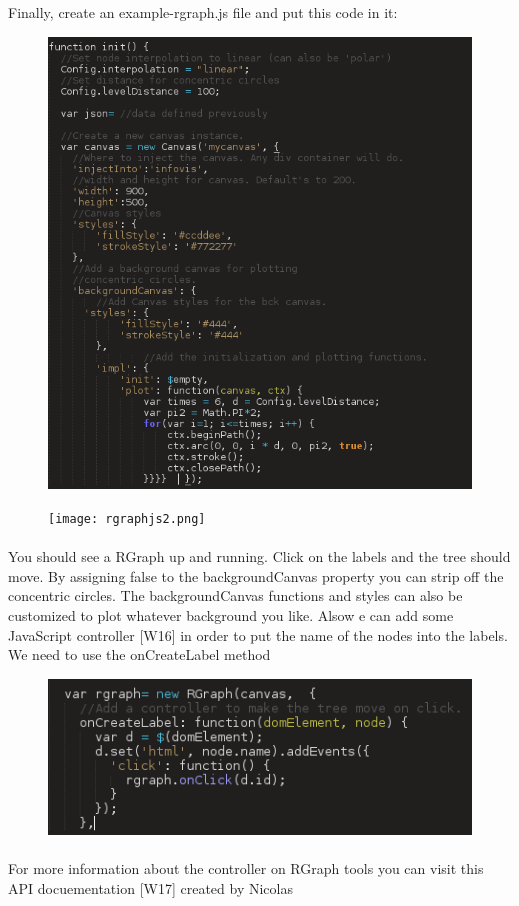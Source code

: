 Finally, create an example-rgraph.js file and put this code in it:
\newpage
\begin{figure}[h]
\centering
\includegraphics[scale=0.5]{rgraphjs1.png}
\end{figure}
\begin{figure}[h]
\centering
\texttt{[image: rgraphjs2.png]}
\end{figure}
\newpage
\paragraph*{}
You should see a RGraph up and running. Click on the labels and the tree should move. By assigning false to the backgroundCanvas property you can strip off the concentric circles. The backgroundCanvas functions and styles can also be customized to plot whatever background you like. Alsow e can add some JavaScript controller [W16] in order to put the name of the nodes into the labels. We need to use the onCreateLabel method
\begin{figure}[h]
\centering
\includegraphics[scale=0.5]{controller.png}
\end{figure}
\paragraph*{}
For more information about the controller on RGraph tools you can visit this API docuementation [W17] created by Nicolas 
